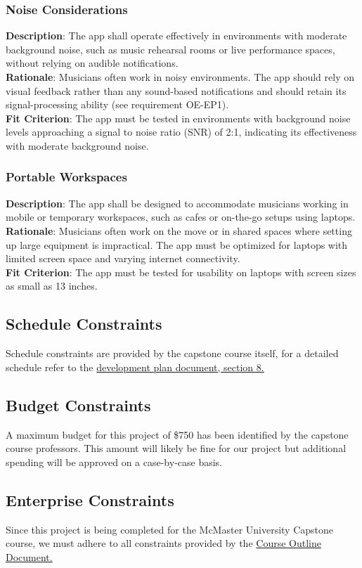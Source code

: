 \documentclass[12pt]{article}
\begin{document}
\subsubsection*{Noise Considerations}
\textbf{Description}: The app shall operate effectively in environments with moderate background noise, such as music rehearsal rooms or live performance spaces, without relying on audible notifications.\\
\textbf{Rationale}: Musicians often work in noisy environments. The app should rely on visual feedback rather than any sound-based notifications and should retain its signal-processing ability (see requirement OE-EP1).\\
\textbf{Fit Criterion}: The app must be tested in environments with background noise levels approaching a signal to noise ratio (SNR) of 2:1, indicating its effectiveness with moderate background noise.
\subsubsection*{Portable Workspaces}
\textbf{Description}: The app shall be designed to accommodate musicians working in mobile or temporary workspaces, such as cafes or on-the-go setups using laptops.\\
\textbf{Rationale}: Musicians often work on the move or in shared spaces where setting up large equipment is impractical. The app must be optimized for laptops with limited screen space and varying internet connectivity.\\
\textbf{Fit Criterion}: The app must be tested for usability on laptops with screen sizes as small as 13 inches.

\subsection{Schedule Constraints}
Schedule constraints are provided by the capstone course itself, for a detailed schedule refer to the \href{https://github.com/emilyperica/ScoreGen/blob/main/docs/DevelopmentPlan/DevelopmentPlan.pdf}{development plan document, section 8.}
\subsection{Budget Constraints}
A maximum budget for this project of \$750 has been identified by the capstone course professors. This amount will likely be fine for our project but additional spending will be approved on a case-by-case basis.
\subsection{Enterprise Constraints}
Since this project is being completed for the McMaster University Capstone course, we must adhere to all constraints provided by the \href{https://gitlab.cas.mcmaster.ca/courses/capstone/-/blob/main/CourseOutline/Capstone_Outline.pdf}{Course Outline Document.}
\end{document}
